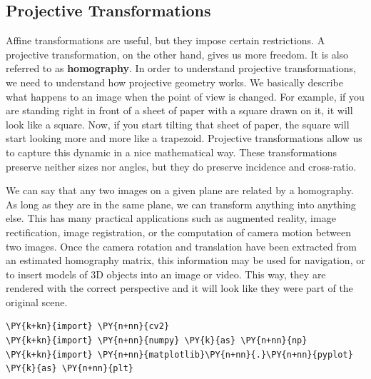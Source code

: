 \subsection{Projective Transformations}
Affine transformations are useful, but they impose certain restrictions. A projective transformation, on the other hand, gives us more freedom. It is also referred to as \textbf{homography}. In order to understand projective transformations, we need to understand how projective geometry works. We basically describe what happens to an image when the point of view is changed. For example, if you are standing right in front of a sheet of paper with a square drawn on it, it will look like a square. Now, if you start tilting that sheet of paper, the square will start looking more and more like a trapezoid. Projective transformations allow us to capture this dynamic in a nice mathematical way. These transformations preserve neither sizes nor angles, but they do preserve incidence and cross-ratio.

We can say that any two images on a given plane are related by a homography. As long as they are in the same plane, we can transform anything into anything else. This has many practical applications such as augmented reality, image rectification, image registration, or the computation of camera motion between two images. Once the camera rotation and translation have been extracted from an estimated homography matrix, this information may be used for navigation, or to insert models of 3D objects into an image or video. This way, they are rendered with the correct perspective and it will look like they were part of the original scene.

\vspace{0.5cm}

 \begin{tcolorbox}[breakable, size=fbox, boxrule=1pt, pad at break*=1mm,colback=cellbackground, colframe=cellborder]
	\begin{Verbatim}[commandchars=\\\{\}]
\PY{k+kn}{import} \PY{n+nn}{cv2}
\PY{k+kn}{import} \PY{n+nn}{numpy} \PY{k}{as} \PY{n+nn}{np}
\PY{k+kn}{import} \PY{n+nn}{matplotlib}\PY{n+nn}{.}\PY{n+nn}{pyplot} \PY{k}{as} \PY{n+nn}{plt}
	\end{Verbatim}
\end{tcolorbox}

